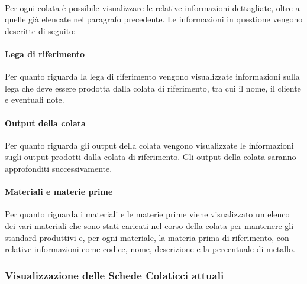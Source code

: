   \paragraph{}
  Per ogni colata è possibile visualizzare le relative informazioni dettagliate, oltre a quelle già 
  elencate nel paragrafo precedente. Le informazioni in questione vengono descritte di seguito:
  \paragraph{Lega di riferimento}
  Per quanto riguarda la lega di riferimento vengono visualizzate informazioni sulla lega che deve 
  essere prodotta dalla colata di riferimento, tra cui il nome, il cliente e eventuali note.
  \paragraph{Output della colata}
  Per quanto riguarda gli output della colata vengono visualizzate le informazioni sugli output prodotti 
  dalla colata di riferimento. Gli output della colata saranno approfonditi successivamente.
  \paragraph{Materiali e materie prime}
  Per quanto riguarda i materiali e le materie prime viene visualizzato un elenco dei vari materiali 
  che sono stati caricati nel corso della colata per mantenere gli standard produttivi e, per ogni 
  materiale, la materia prima di riferimento, con relative informazioni come codice, nome, 
  descrizione e la percentuale di metallo.

  \subsubsection{Visualizzazione delle Schede Colaticci attuali}
